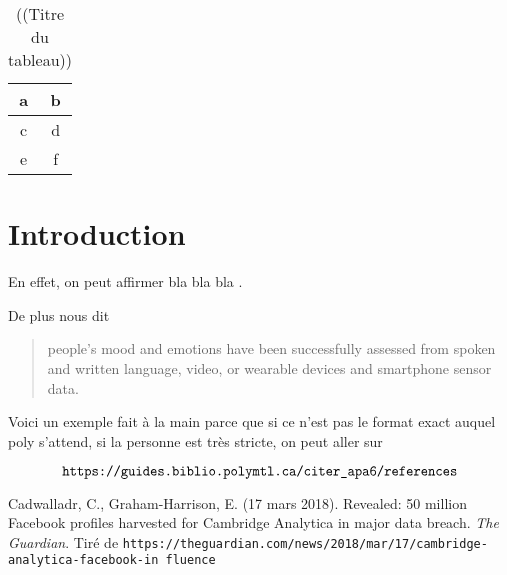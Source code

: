 \documentclass[12pt]{article}
\begin{document}

\thispagestyle{empty}


\tableofcontents
\newpage
\setcounter{page}{1}

\begin{table}
  \centering
  \begin{tabular}{c|c}
    a & b \\ \hline
    c & d \\
    e & f
  \end{tabular}
  \caption{((Titre du tableau))}
\end{table}

\section*{Introduction}

En effet, on peut affirmer \og bla bla bla \fg {}.

De plus  nous dit

  \begin{quote}
    \singlespacing
  [...] people’s mood and emotions have been successfully assessed from spoken and written language, video, or wearable devices and smartphone sensor data.
  \end{quote}

  Voici un exemple fait à la main parce que si ce n'est pas le format exact
  auquel poly s'attend, si la personne est très stricte, on peut aller sur

  \[\verb+https://guides.biblio.polymtl.ca/citer_apa6/references+\]

\singlespacing
  Cadwalladr, C., Graham-Harrison, E. (17 mars 2018). Revealed: 50 million
Facebook profiles harvested for Cambridge Analytica in major data breach. \emph{The Guardian}. Tiré de
\texttt{https://\allowbreak theguardian.com\allowbreak/news\allowbreak/2018\allowbreak/mar\allowbreak/17\allowbreak/cambridge\allowbreak-analytica\allowbreak-facebook\allowbreak-in\allowbreak
  fluence\allowbreak}


\newpage

\singlespacing


\end{document}
